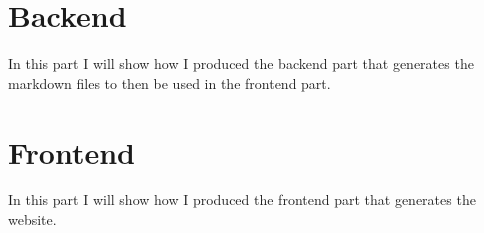 \section{Backend}
\label{s:Backend}
In this part I will show how I produced the backend part that generates the markdown files to then be used in the frontend part.

\section{Frontend}
\label{s:Frontend}
In this part I will show how I produced the frontend part that generates the website.
